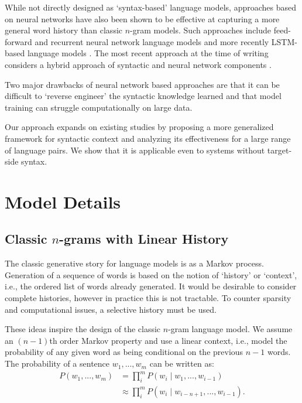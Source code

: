 \documentclass[english]{jnlp_1.4}
\begin{document}
While not directly designed as `syntax-based' language models, approaches based
on neural networks have also been shown to be effective at capturing a more
general word history than classic $n$-gram models. Such approaches include
feed-forward \cite{Bengio03,Schwenk07} and recurrent \cite{Mikolov10}
neural network language models and more recently LSTM-based language
models \cite{Sundermeyer12}. The most recent approach at the time of writing
considers a hybrid approach of syntactic and neural network components \cite{Sennrich15}.

Two major drawbacks of neural network based approaches are that it can be difficult to `reverse
engineer' the syntactic knowledge learned and that model training can struggle
computationally on large data.

Our approach expands on existing studies by proposing
a more generalized framework for syntactic context and analyzing its
effectiveness for a large range of language pairs. We show that it is
applicable even to systems without target-side syntax.



\section{Model Details}

\subsection{Classic $n$-grams with Linear History}

The classic generative story for language models is as a Markov process.
Generation of a sequence of words is based on the notion of `history' or `context',
i.e., the ordered list of words already generated. It would be desirable
to consider complete histories, however in practice this is not tractable.
To counter sparsity and computational issues, a selective history must be used.

These ideas inspire the design of the classic $n$-gram language model. We
assume an $(n-1)$th order Markov property and use a linear context, i.e., model
the probability of any given word as being conditional on the previous $n-1$ words.
The probability of a sentence $w_1, ..., w_m$ can be written as:
\begin{align*}
   P(w_1, ..., w_m) & = \prod_i^m P(w_i \mid w_1, ..., w_{i-1}) \\
                    & \approx \prod_i^m P(w_i \mid w_{i-n+1}, ..., w_{i-1}).
\end{align*}
\end{document}

